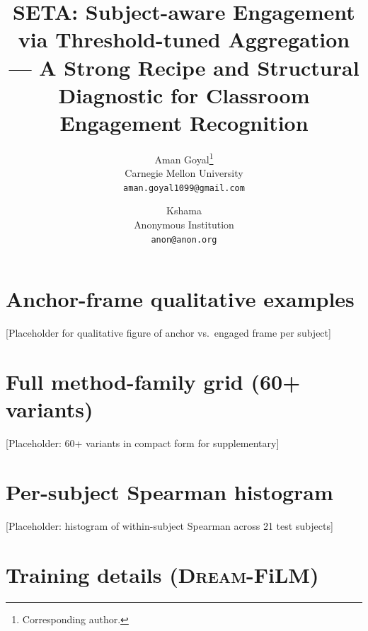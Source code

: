 \documentclass[10pt,twocolumn,letterpaper]{article}
\title{SETA: Subject-aware Engagement via Threshold-tuned Aggregation\\
       --- A Strong Recipe and Structural Diagnostic for Classroom
       Engagement Recognition}
\author{Aman Goyal\thanks{Corresponding author.}\\
Carnegie Mellon University\\
{\tt\small aman.goyal1099@gmail.com}
\and
Kshama\\
Anonymous Institution\\
{\tt\small anon@anon.org}
}
\begin{document}
\maketitle












\clearpage
\appendix
\section{Anchor-frame qualitative examples}
\label{sec:anchor-qual}
[Placeholder for qualitative figure of anchor vs.\ engaged frame per subject]

\section{Full method-family grid (60+ variants)}
\label{sec:full-table}
[Placeholder: 60+ variants in compact form for supplementary]

\section{Per-subject Spearman histogram}
\label{sec:per-subj-rho}
[Placeholder: histogram of within-subject Spearman across 21 test subjects]

\section{Training details (\textsc{Dream}-FiLM)}
\label{sec:training}
\end{document}
